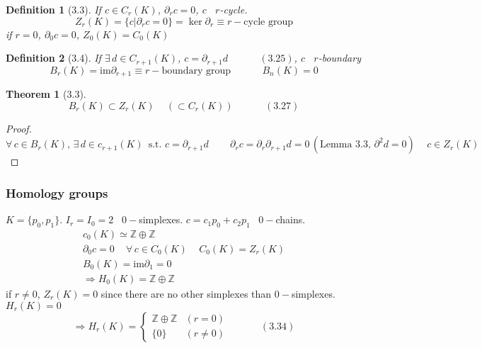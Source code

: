 \documentclass[twoside]{amsart}
\newtheorem{theorem}{Theorem}
\newtheorem{definition}{Definition}
\newcommand{\exercisehead}[1]
  {\smallskip
   \noindent{\large\bf Exercise #1.}
   }
\begin{document}
\begin{definition}[3.3] If $c \in C_r(K)$, $\partial_r c = 0$, $c$ \, $r$-cycle. 
\[
\boxed{ Z_r(K) = \lbrace c | \partial_r c =0 \rbrace  = \ker{\partial_r} \equiv r-\text{cycle group} }
\]
if $r =0$, $\partial_0 c =0$, $Z_0(K) = C_0(K)$
\end{definition}

\begin{definition}[3.4] If $\exists \, d \in C_{r+1}(K)$, $c = \partial_{r+1} d \quad \quad \quad \, (3.25)$, $c$ \, $r$-boundary
\[
\boxed{ B_r(K) = \text{im}{\partial_{r+1}} \equiv r-\text{boundary group} \quad \quad \quad \, B_n(K) =0  }
\]
\end{definition}

\begin{theorem}[3.3] 
\begin{equation}
  B_r(K) \subset Z_r(K) \quad \, (\subset C_r(K)) \quad \quad \quad \, (3.27)
\end{equation}
\end{theorem}

\begin{proof} 
\[  
\forall \, c \in B_r(K), \, \exists \, d \in c_{r+1}(K) \, \text{ s.t. } c = \partial_{r+1}d \quad \quad \, \partial_r c  = \partial_r \partial_{r+1} d = 0 \, (\text{Lemma } 3.3, \, \partial^2 d =0) \quad \, c \in Z_r(K)
\]
\end{proof}

\subsubsection{Homology groups}

\exercisehead{3.1}
  $K = \lbrace p_0, p_1 \rbrace$. $I_r = I_0 = 2$ \, $0-$simplexes.  $c=  c_1 p_0 + c_2 p_1$ \, $0-$chains.  \\
\[
\begin{gathered}
  c_0(K) \simeq \mathbb{Z} \oplus \mathbb{Z} \\
  \partial_0 c = 0 \quad \, \forall \, c \in C_0(K) \quad \, C_0(K) = Z_r(K) \\
  B_0(K) = \text{im}{\partial_1} =0 \\
  \Longrightarrow H_0(K) = \mathbb{Z} \oplus \mathbb{Z} 
\end{gathered}
\]
if $r\neq 0$, $Z_r(K) = 0$ since there are no other simplexes than $0-$simplexes.  $H_r(K) =0$
\begin{equation}
\Longrightarrow H_r(K) = \begin{cases} \mathbb{Z} \oplus \mathbb{Z} & (r=0) \\ 
  \lbrace 0 \rbrace & (r\neq 0) \end{cases} \quad \quad \quad \, (3.34)
\end{equation}
\end{document}
